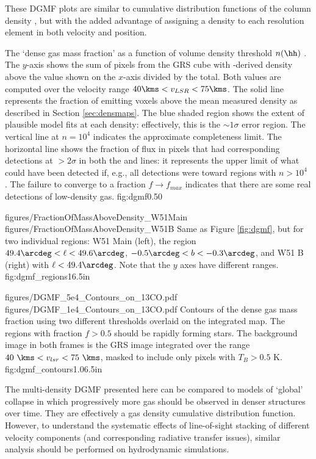These DGMF plots are similar to cumulative distribution functions of the column
density \citep[e.g.][Figure 6]{Battersby2014a}, but with the added advantage of
assigning a density to each resolution element in both velocity and position.

{The `dense gas mass fraction' as a function of volume density threshold
$n(\hh)$ \percc.  The $y$-axis shows the sum of \thirteenco pixels from the GRS
cube with
\formaldehyde-derived density above the value shown on the $x$-axis divided by
the total.  Both values are computed over the velocity range $40 \kms < v_{LSR}
< 75 \kms$.  The solid line represents the fraction of \thirteenco emitting
voxels above the mean measured \formaldehyde density as described in Section
\ref{sec:densmaps}.
The blue shaded region shows the extent of plausible model fits at
each density: effectively, this is the $\sim1\sigma$ error region.  The
vertical line at $n=10^4$ \percc indicates the approximate completeness limit.
The horizontal line shows the fraction of \thirteenco flux in pixels that had
corresponding detections at
$>2\sigma$ in both the \formaldehyde \oneone and \twotwo lines: it represents
the upper limit of what could have been detected if, e.g., all \formaldehyde
detections were
toward regions with $n>10^4$ \percc.  The failure to converge to a fraction
$f\rightarrow f_{max}$ indicates that there are some real detections of
low-density gas.}
{fig:dgmf}{0.5}{0}

\FigureTwoAA
{figures/FractionOfMassAboveDensity_W51Main}
{figures/FractionOfMassAboveDensity_W51B}
{Same as Figure \ref{fig:dgmf}, but for two individual regions: W51 Main
(left), the region $49.4\arcdeg < \ell < 49.6\arcdeg$, $-0.5\arcdeg < b <
-0.3\arcdeg$, and W51 B (right) with $\ell < 49.4\arcdeg$.  Note
that the $y$ axes have different ranges.}
{fig:dgmf_regions}{1}{6.5in}

\FigureTwoAA
{figures/DGMF_5e4_Contours_on_13CO.pdf}
{figures/DGMF_1e4_Contours_on_13CO.pdf}
{Contours of the dense gas mass fraction using two different thresholds
overlaid on the integrated \thirteenco map.  The regions with fraction $f>0.5$
should be rapidly forming stars.  The background image in both frames is the
GRS \thirteenco image integrated over the range $40~\kms < v_{lsr} < 75~\kms$,
masked to include only pixels with $T_B>0.5$ K.}
{fig:dgmf_contours}{1.0}{6.5in}

The multi-density DGMF presented here can be compared to models of `global'
collapse in which progressively more gas should be observed in denser structures
over time.  They are effectively a gas density cumulative distribution function.
However, to understand the systematic effects of line-of-sight stacking of
different velocity components (and corresponding radiative transfer issues),
similar analysis should be performed on hydrodynamic simulations.

